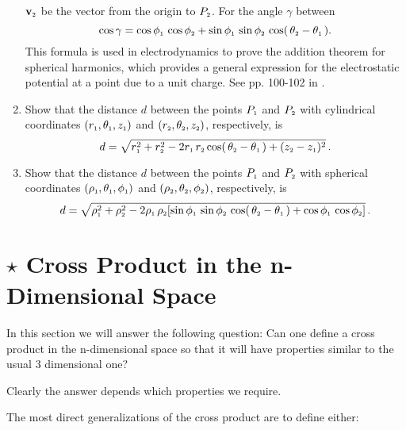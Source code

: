 \begin{enumerate}
  $\textbf{v}_{\scriptscriptstyle 2}$ be the vector from the origin to $P_{\scriptscriptstyle 2}$. For the angle $\gamma$ between
  \begin{displaymath}
   \cos \gamma = \cos \phi_{\scriptscriptstyle 1} \, \cos \phi_{\scriptscriptstyle 2} + \sin \phi_{\scriptscriptstyle 1} \, \sin \phi_{\scriptscriptstyle 2} \,
    \cos ( \, \theta_{\scriptscriptstyle 2} - \theta_{\scriptscriptstyle 1} \, ) .
  \end{displaymath}
  This formula is used in electrodynamics to prove the addition theorem for spherical harmonics, which provides a
  general expression for the electrostatic potential at a point due to a unit charge. See pp. 100-102 in \cite{jac}.
 \item Show that the distance $d$ between the points $P_{\scriptscriptstyle 1}$ and $P_{\scriptscriptstyle 2}$ with cylindrical coordinates
  $( r_{\scriptscriptstyle 1},\theta_{\scriptscriptstyle 1},z_{\scriptscriptstyle 1} )$ and $( r_{\scriptscriptstyle 2},\theta_{\scriptscriptstyle 2},z_{\scriptscriptstyle 2} )$, respectively, is
  \begin{displaymath}
   d = \sqrt{r_{\scriptscriptstyle 1}^2 + r_{\scriptscriptstyle 2}^2 - 2 r_{\scriptscriptstyle 1}\,r_{\scriptscriptstyle 2} \cos (\, \theta_{\scriptscriptstyle 2} - \theta_{\scriptscriptstyle 1} \,)
   + ( z_{\scriptscriptstyle 2} - z_{\scriptscriptstyle 1} )^2} \, .
  \end{displaymath}
 \item Show that the distance $d$ between the points $P_{\scriptscriptstyle 1}$ and $P_{\scriptscriptstyle 2}$ with spherical coordinates
  $( \rho_{\scriptscriptstyle 1},\theta_{\scriptscriptstyle 1},\phi_{\scriptscriptstyle 1} )$ and $( \rho_{\scriptscriptstyle 2},\theta_{\scriptscriptstyle 2},\phi_{\scriptscriptstyle 2} )$,
  respectively, is
  \begin{displaymath}
   d = \sqrt{\rho_{\scriptscriptstyle 1}^2 + \rho_{\scriptscriptstyle 2}^2 - 2 \rho_{\scriptscriptstyle 1}\,\rho_{\scriptscriptstyle 2} [ \sin \phi_{\scriptscriptstyle 1} \,
    \sin \phi_{\scriptscriptstyle 2} \,\cos ( \, \theta_{\scriptscriptstyle 2} - \theta_{\scriptscriptstyle 1} \, ) +
    \cos \phi_{\scriptscriptstyle 1} \, \cos \phi_{\scriptscriptstyle 2} ]} \, .
  \end{displaymath}
\end{enumerate}


\section{$\star$ Cross Product in the n-Dimensional Space}

In this section we will answer the following question: Can one define a cross product in the n-dimensional space so that it will have properties similar to the usual 3 dimensional one?

Clearly the answer depends which properties we require.


The most direct
generalizations of the cross product are to define either:

